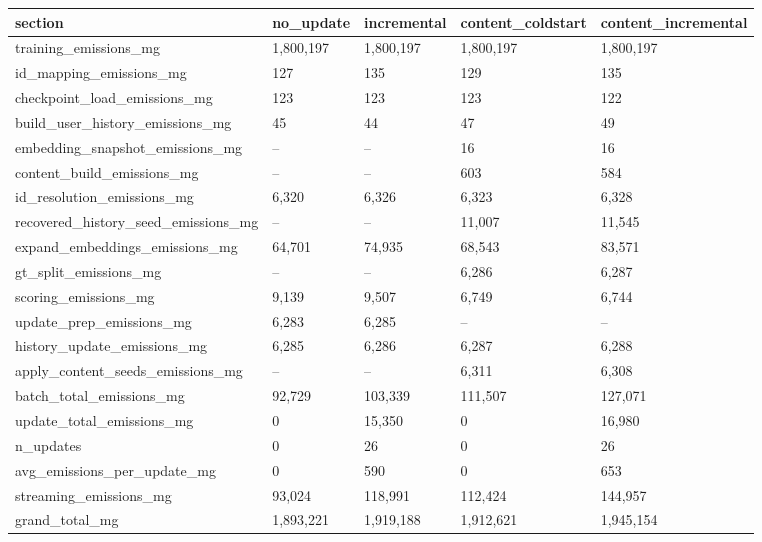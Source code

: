 \begin{tabular}{lllll}
\toprule
section & no_update & incremental & content_coldstart & content_incremental \\
\midrule
training_emissions_mg & 1,800,197 & 1,800,197 & 1,800,197 & 1,800,197 \\
id_mapping_emissions_mg & 127 & 135 & 129 & 135 \\
checkpoint_load_emissions_mg & 123 & 123 & 123 & 122 \\
build_user_history_emissions_mg & 45 & 44 & 47 & 49 \\
embedding_snapshot_emissions_mg & -- & -- & 16 & 16 \\
content_build_emissions_mg & -- & -- & 603 & 584 \\
id_resolution_emissions_mg & 6,320 & 6,326 & 6,323 & 6,328 \\
recovered_history_seed_emissions_mg & -- & -- & 11,007 & 11,545 \\
expand_embeddings_emissions_mg & 64,701 & 74,935 & 68,543 & 83,571 \\
gt_split_emissions_mg & -- & -- & 6,286 & 6,287 \\
scoring_emissions_mg & 9,139 & 9,507 & 6,749 & 6,744 \\
update_prep_emissions_mg & 6,283 & 6,285 & -- & -- \\
history_update_emissions_mg & 6,285 & 6,286 & 6,287 & 6,288 \\
apply_content_seeds_emissions_mg & -- & -- & 6,311 & 6,308 \\
batch_total_emissions_mg & 92,729 & 103,339 & 111,507 & 127,071 \\
update_total_emissions_mg & 0 & 15,350 & 0 & 16,980 \\
n_updates & 0 & 26 & 0 & 26 \\
avg_emissions_per_update_mg & 0 & 590 & 0 & 653 \\
streaming_emissions_mg & 93,024 & 118,991 & 112,424 & 144,957 \\
grand_total_mg & 1,893,221 & 1,919,188 & 1,912,621 & 1,945,154 \\
\bottomrule
\end{tabular}

